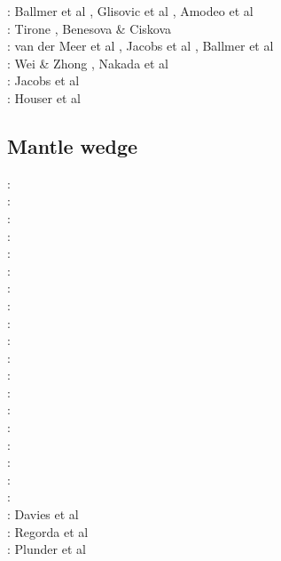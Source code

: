 \begin{scriptsize}
\twothousandfifteen: Ballmer et al \cite{basn15}, Glisovic et al \cite{glfa15}, Amodeo et al \cite{amsb15}\\
\twothousandsixteen: Tirone \cite{tiro16}, Benesova \& Ciskova \cite{beci16}\\
\twothousandseventeen: van der Meer et al \cite{vavs17}, Jacobs et al \cite{jasv17}, Ballmer et al \cite{bahh17}\\
\twothousandeighteen: Wei \& Zhong \cite{mazh18}, Nakada et al \cite{naoi18}\\
\twothousandnineteen: Jacobs et al \cite{jasv19}\\
\twothousandtwenty: Houser et al \cite{hohv20}
\end{scriptsize}


\subsection{Mantle wedge} 

\begin{scriptsize}
\nineteensixtynine: \cite{mcke69}\\
\nineteenseventyone: \cite{tomj71}\\
\nineteenseventyeight: \cite{tosl78}\\
\nineteenseventynine: \cite{bobo79}\\
\nineteeneightyfive: \cite{hond85}\\
\nineteenninetytwo: \cite{dast92}\\
\nineteenninetythree: \cite{furu93}\\
\nineteenninetynine: \cite{pewa99}\\
\twothousandone: \cite{bigu01}\cite{haki01}\\
\twothousandtwo: \cite{vakp02}\\
\twothousandthree: \cite{vank03}\\
\twothousandfour: \cite{enwi04}\\
\twothousandsix: \cite{gogc06}\cite{gecy06}\\
\twothousandseven: \cite{gogc07}\cite{knvk07}\cite{lohd07}\\
\twothousandeight: \cite{knva08}\cite{cage08}\cite{vack08}\\
\twothousandnine: \cite{leki09}\cite{heaa09}\\
\twothousandten: \cite{roms10}\cite{hogz10}\cite{syab06}\\
\twothousandeleven: \cite{zhgh11}\\
\twothousandfourteen: \cite{ledg14}\cite{mabv14}\\
\twothousandsixteen: Davies et al \cite{dalg16} \\
\twothousandseventeen: Regorda et al \cite{rerm17}\\
\twothousandeighteen: Plunder et al \cite{pltv18}
\end{scriptsize}

